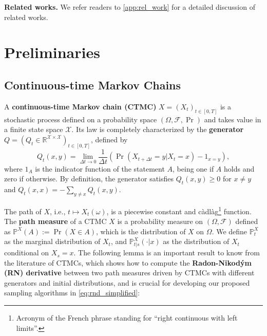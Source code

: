 \documentclass{article}
\theoremstyle{remark}
\renewcommand{\P}{\mathbb{P}}
\newcommand{\R}{\mathbb{R}}
\newcommand{\cF}{\mathcal{F}}
\newcommand{\cX}{\mathcal{X}}
\begin{document}
\textbf{Related works.} We refer readers to \cref{app:rel_work} for a detailed discussion of related works.

\section{Preliminaries}
\label{sec:prelim}
\subsection{Continuous-time Markov Chains}
\label{sec:prelim_ctmc}
A \textbf{continuous-time Markov chain (CTMC)} $X=(X_t)_{t\in[0,T]}$ is a stochastic process defined on a probability space $(\Omega,\cF,\Pr)$ and takes value in a finite state space $\cX$. Its law is completely characterized by the \textbf{generator} $Q=(Q_t\in\R^{\cX\times\cX})_{t\in[0,T]}$, defined by
\begin{equation}
    Q_t(x,y)=\lim_{\Delta t\to0}\frac{1}{\Delta t}(\Pr(X_{t+\Delta t}=y|X_t=x)-1_{x=y}),
    \label{eq:def_gen_mat}
\end{equation}
where $1_A$ is the indicator function of the statement $A$, being one if $A$ holds and zero if otherwise. By definition, the generator satisfies $Q_t(x,y)\ge0$ for $x\ne y$ and $Q_t(x,x)=-\sum_{y\ne x}Q_t(x,y)$.

The path of $X$, i.e., $t\mapsto X_t(\omega)$, is a piecewise constant and c\`adl\`ag\footnote{Acronym of the French phrase standing for ``right continuous with left limits''.} function. The \textbf{path measure} of a CTMC $X$ is a probability measure on $(\Omega,\cF)$ defined as $\P^X(A):=\Pr(X\in A)$, which is the distribution of $X$ on $\Omega$. We define $\P^X_t$ as the marginal distribution of $X_t$, and $\P^X_{t|s}(\cdot|x)$ as the distribution of $X_t$ conditional on $X_s=x$. The following lemma is an important result to know from the literature of CTMCs, which shows how to compute the \textbf{Radon-Nikod\'ym (RN) derivative} between two path measures driven by CTMCs with different generators and initial distributions, and is crucial for developing our proposed sampling algorithms in \cref{eq:rnd_simplified}:
\end{document}
